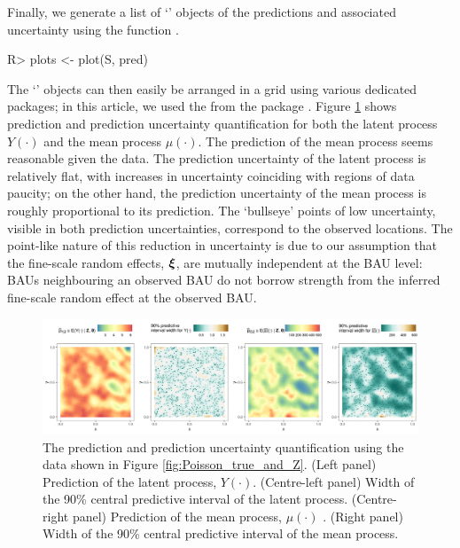 \documentclass[article]{jss}
\newcommand{\class}[1]{`\code{#1}'}
\newcommand{\fct}[1]{\code{#1()}}
\def\mbf#1{{%
\mathchoice%
{\hbox{\boldmath$\displaystyle{#1}$}}%
{\hbox{\boldmath$\textstyle{#1}$}}%
{\hbox{\boldmath$\scriptstyle{#1}$}}%
{\hbox{\boldmath$\scriptscriptstyle{#1}$}}%
}}
\def\vec{\mbf}
\begin{document}
Finally, we generate a list of \class{ggplot} \citep{Wickham_2016_ggplot2} objects of the predictions and associated uncertainty using the function \fct{plot}. 
\begin{Code}
R> plots <- plot(S, pred)
\end{Code}
The \class{ggplot} objects can then easily be arranged in a grid using various dedicated packages; in this article, we used the \fct{ggarrange} from the package  \citep{Kassambara_2020_ggpubr}. Figure \ref{fig:Poisson_nres3} shows prediction and prediction uncertainty quantification for both the latent process $Y(\cdot)$ and the mean process $\mu(\cdot)$. %
The prediction of the mean process seems reasonable given the data. 
The prediction uncertainty of the latent process is relatively flat, with increases in uncertainty coinciding with regions of data paucity; on the other hand, the prediction uncertainty of the mean process is roughly proportional to its prediction. %
The  `bullseye' points of low uncertainty, visible in both prediction uncertainties, correspond to the observed locations. 
The point-like nature of this reduction in uncertainty is due to our assumption that the fine-scale random effects, $\vec{\xi}$, are mutually independent at the BAU level: BAUs neighbouring an observed BAU do not borrow strength from the inferred fine-scale random effect at the observed BAU.
\begin{figure}[t!]
    \centering
    \includegraphics[width = \linewidth]{img/Poisson_sim.png}
    \caption{The prediction and prediction uncertainty quantification using the data shown in Figure \ref{fig:Poisson_true_and_Z}. (Left panel) Prediction of the latent process, $Y(\cdot)$. (Centre-left panel) Width of the 90\% central predictive interval of the latent process. (Centre-right panel) Prediction of the mean process, $\mu(\cdot)$ . (Right panel) Width of the 90\% central predictive interval of the mean process. 
}   
  \label{fig:Poisson_nres3}
\end{figure}
\end{document}
